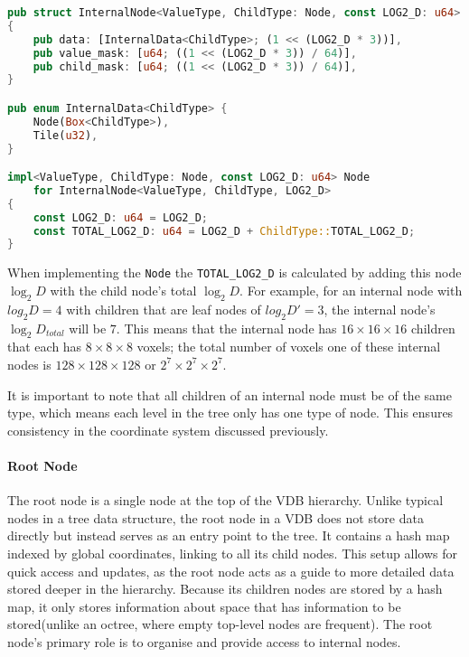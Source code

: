 \begin{lstlisting}[language=rust, captionpos=b, caption={
    \texttt{InternalNode} definition. Internal nodes have an extra field, the child mask, which is the same size as the value mask.
    Additionally, the internal data enum now has variants for a child pointer or 4 bytes of memory.
}]
pub struct InternalNode<ValueType, ChildType: Node, const LOG2_D: u64>
{
    pub data: [InternalData<ChildType>; (1 << (LOG2_D * 3))],
    pub value_mask: [u64; ((1 << (LOG2_D * 3)) / 64)],
    pub child_mask: [u64; ((1 << (LOG2_D * 3)) / 64)],
}

pub enum InternalData<ChildType> {
    Node(Box<ChildType>),
    Tile(u32),
}

impl<ValueType, ChildType: Node, const LOG2_D: u64> Node
    for InternalNode<ValueType, ChildType, LOG2_D>
{
    const LOG2_D: u64 = LOG2_D;
    const TOTAL_LOG2_D: u64 = LOG2_D + ChildType::TOTAL_LOG2_D;
}
\end{lstlisting}

When implementing the \verb|Node| the \verb|TOTAL_LOG2_D| is calculated by adding this node $\log_{2}D$ with the child node's total $\log_{2}D$.
For example, for an internal node with $log_{2}D = 4$ with children that are leaf nodes of $log_{2}D' = 3$, the internal node's $\log_{2}D_{{total}}$ will be $7$. This means that the internal node has $16\times16\times16$  children that each has $8\times8\times8$ voxels; the total number of voxels one of these internal nodes is $128\times128\times128$ or $2^{7}\times2^{7}\times2^{7}$.

It is important to note that all children of an internal node must be of the same type, which means each level in the tree only has one type of node. This ensures consistency in the coordinate system discussed previously.

\paragraph{Root Node} The root node is a single node at the top of the VDB hierarchy. Unlike typical nodes in a tree data structure, the root node in a VDB does not store data directly but instead serves as an entry point to the tree.
It contains a hash map indexed by global coordinates, linking to all its child nodes. This setup allows for quick access and updates, as the root node acts as a guide to more detailed data stored deeper in the hierarchy. Because its children nodes are stored by a hash map, it only stores information about space that has information to be stored(unlike an octree, where empty top-level nodes are frequent). The root node's primary role is to organise and provide access to internal nodes.

